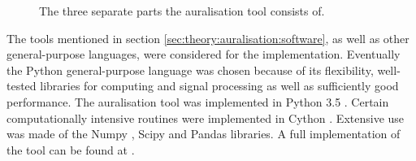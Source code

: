 \begin{figure}[H]
  \centering
{}
  \caption{The three separate parts the auralisation tool consists of.}
  \label{fig:implementation:overview}
\end{figure}

The tools mentioned in section \ref{sec:theory:auralisation:software}, as well as other
general-purpose languages, were considered for the implementation.
Eventually the Python general-purpose language was chosen because of its flexibility,
well-tested libraries for computing and signal processing as well as sufficiently good
performance. The auralisation tool was implemented in Python 3.5 \cite{Python}.
Certain computationally intensive routines were implemented in Cython \cite{Behnel2011,Cython}.
Extensive use was made of the Numpy \cite{VanderWalt2011,Numpy}, Scipy \cite{Scipy} and
Pandas \cite{Mckinney2010} libraries. A full implementation of the tool can be
found at \cite{Rietdijk2017d}.
